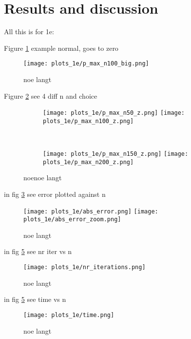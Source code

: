 \documentclass[11pt,a4wide]{article}
\begin{document}
\newpage
\part{Results and discussion}

All this is for 1e:

Figure \ref{fig: p_max_big} example normal, goes to zero

\begin{figure} [ht]
\centering
\texttt{[image: plots\_1e/p\_max\_n100\_big.png]}
\caption{noe langt}
\label{fig: p_max_big}
\end{figure}

Figure \ref{fig: p_max_zoom} see 4 diff n and choice
\begin{figure} [t!]
\centering
	\begin{subfigure}[t]{0.7\textwidth}
		\centering
		\texttt{[image: plots\_1e/p\_max\_n50\_z.png]}
		\texttt{[image: plots\_1e/p\_max\_n100\_z.png]}
	\end{subfigure}
	~
	\begin{subfigure}[t]{0.7\textwidth}
		\centering
		\texttt{[image: plots\_1e/p\_max\_n150\_z.png]}
		\texttt{[image: plots\_1e/p\_max\_n200\_z.png]}
	\end{subfigure}
\caption{noenoe langt}
\label{fig: p_max_zoom}
\end{figure}

in fig \ref{fig: abs.err_n} see error plotted against n
\begin{figure} [ht]
\centering
\texttt{[image: plots\_1e/abs\_error.png]}
\texttt{[image: plots\_1e/abs\_error\_zoom.png]}
\caption{noe langt}
\label{fig: abs.err_n}
\end{figure}

in fig \ref{fig: nr_iter} see nr iter vs n
\begin{figure} [ht]
\centering
\texttt{[image: plots\_1e/nr\_iterations.png]}
\caption{noe langt}
\label{fig: nr_iter}
\end{figure}

in fig \ref{fig: nr_iter} see time vs n

\begin{figure} [ht]
\centering
\texttt{[image: plots\_1e/time.png]}
\caption{noe langt}
\label{fig: nr_iter}
\end{figure}
\end{document}
